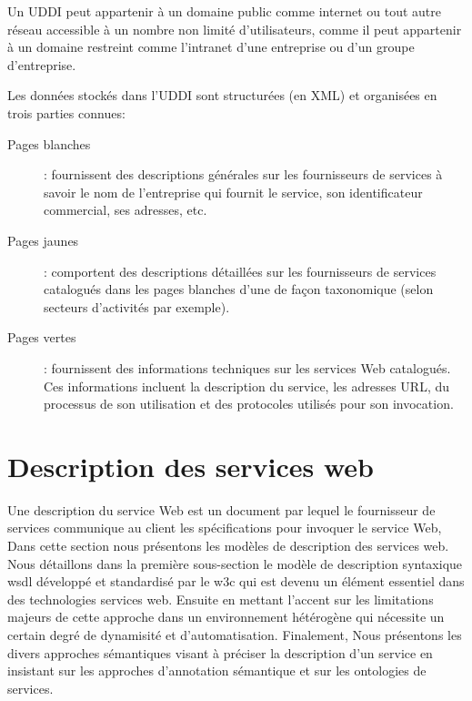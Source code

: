 	Un \textsc{UDDI} peut appartenir à un domaine public comme internet ou tout autre réseau accessible à un nombre
       	non limité d’utilisateurs, comme il peut appartenir à un domaine restreint comme l'intranet d’une entreprise 
	ou d'un groupe d'entreprise.

	Les données stockés dans l'UDDI sont structurées (en \textsc{XML}) et organisées en trois parties 
	connues:

	\begin{description} %
	    \item[Pages blanches]:
		fournissent des descriptions générales sur les fournisseurs de services à savoir le nom de 
		l'entreprise qui fournit le service, son identificateur commercial, ses adresses, etc.

	    \item[Pages jaunes]:
		comportent des descriptions détaillées sur les fournisseurs de services catalogués dans les pages 
		blanches d'une de façon taxonomique (selon secteurs d'activités par exemple).

	    \item[Pages vertes]:
		fournissent des informations techniques sur les services Web catalogués. Ces informations incluent 
		la description du service, les adresses \textsc{URL}, du processus de son utilisation 
		et des protocoles utilisés pour son invocation.

	\end{description}



\section{Description des services web} 

    Une description du service Web est un document par lequel le fournisseur de services communique au client 
    les spécifications pour invoquer le service Web, Dans cette section nous présentons les modèles de description
    des services web. Nous détaillons dans la première sous-section le modèle de description syntaxique \acrshort{wsdl}
    \cite{chinnici2007web} développé et standardisé par le \acrshort{w3c} qui est devenu un élément essentiel 
    dans des technologies services web. Ensuite en mettant l'accent sur les limitations majeurs de cette
    approche dans un environnement hétérogène qui nécessite un certain degré de dynamisité et d'automatisation.
    Finalement, Nous présentons les divers approches sémantiques visant à préciser la description d'un
    service en insistant sur les approches d'annotation sémantique et sur les ontologies de services.

